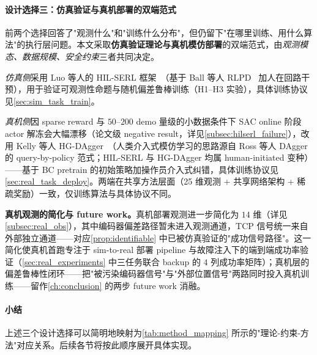 \paragraph{设计选择三：仿真验证与真机部署的双端范式} 前两个选择回答了"观测什么"和"训练什么分布"，但仍留下"在哪里训练、用什么算法"的执行层问题。本文采取\textbf{仿真验证理论与真机模仿部署}的双端范式，由\emph{观测模态、数据规模、安全约束}三者共同决定。

\emph{仿真侧}采用 Luo 等人的 HIL-SERL 框架~\cite{luo2025hilserl}（基于 Ball 等人 RLPD~\cite{ball2023rlpd} 加人在回路干预），用于验证可观测性命题与随机偏差鲁棒训练（H1–H3 实验），具体训练协议见\cref{sec:sim_task_train}。

\emph{真机侧}因 sparse reward 与 $50$–$200$ demo 量级的小数据条件下 SAC online 阶段 actor 解冻会大幅漂移（论文级 negative result，详见\cref{subsec:hilserl_failure}），改用 Kelly 等人 HG-DAgger~\cite{kelly2019hgdagger}（人类介入式模仿学习的思路源自 Ross 等人 DAgger~\cite{ross2011dagger} 的 query-by-policy 范式；HIL-SERL 与 HG-DAgger 均属 human-initiated 变种）——基于 BC pretrain 的初始策略加操作员介入式纠错，具体训练协议见\cref{sec:real_task_deploy}。两端在共享方法层面（25 维观测 + 共享网络架构 + 稀疏奖励）一致，仅训练算法与具体协议不同。

\textbf{真机观测的简化与 future work。}真机部署观测进一步简化为 $14$ 维（详见\cref{subsec:real_obs}），其中编码器偏差路径暂未进入观测通道，TCP 信号统一来自外部独立通道——对应\cref{prop:identifiable} 中已被仿真验证的"成功信号路径"。这一简化使真机首跑专注于 sim-to-real 部署 pipeline 与故障注入下的端到端成功率验证（\cref{sec:real_experiments} 中三任务联合 backup 的 $4$ 列成功率矩阵）；真机层的偏差鲁棒性闭环——把"被污染编码器信号"与"外部位置信号"两路同时投入真机训练——留作\cref{ch:conclusion} 的两步 future work 消融。

\paragraph{小结} 上述三个设计选择可以简明地映射为\cref{tab:method_mapping} 所示的"理论-约束-方法"对应关系。后续各节将按此顺序展开具体实现。

